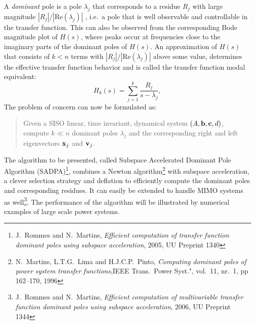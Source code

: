 \documentclass{report}
\begin{document}
A \textit{dominant} pole is a pole $\lambda_j$ that corresponds to a
residue $R_j$ with large
magnitude $|R_j| / |\mbox{Re}(\lambda_j)|$ , i.e.~a pole that is well observable and
controllable in the transfer function. This can also be observed from the
corresponding Bode magnitude plot of $H(s)$, where peaks occur at
frequencies close to the
imaginary parts of the dominant poles of $H(s)$. An approximation of $H(s)$ that
consists of $k<n$ terms with $|R_j|/|\mbox{Re}(\lambda_j)|$ above some
value, determines the effective
transfer function behavior and is called the transfer function modal equivalent:
\begin{equation}
H_k(s) = \sum_{j=1}^k \frac{R_j}{s - \lambda_j},\nonumber
\end{equation}
The problem of concern can now be formulated as:
\begin{quote}
Given a SISO linear, time
invariant, dynamical system $(A,\mathbf{b},\mathbf{c},d)$, compute $k\ll n$ dominant poles
$\lambda_j$ and the corresponding right and left
eigenvectors $\mathbf{x}_j$ and $\mathbf{v}_j$.
\end{quote}

The algorithm to be presented, called Subspace
Accelerated Dominant Pole Algorithm (SADPA)\footnote{J.~Rommes and N.~Martins,
\textit{Efficient computation of transfer function dominant poles using subspace
acceleration}, 2005, UU Preprint 1340}, combines a
Newton algorithm\footnote{N.~Martins, L.T.G.~Lima and H.J.C.P.~Pinto,
\textit{Computing dominant poles of power system transfer functions},IEEE
Trans.~Power Syst.",
vol.~11, nr.~1, pp 162--170, 1996} with subspace acceleration, a clever
selection strategy and deflation to efficiently compute the dominant poles and
corresponding residues. It can easily be extended to handle MIMO systems as
well\footnote{J.~Rommes and N.~Martins,
\textit{Efficient computation of multivariable transfer function dominant
poles using subspace
acceleration}, 2006, UU Preprint 1344}. The performance of the algorithm
will be illustrated by
numerical examples of large scale power systems.
\end{document}
